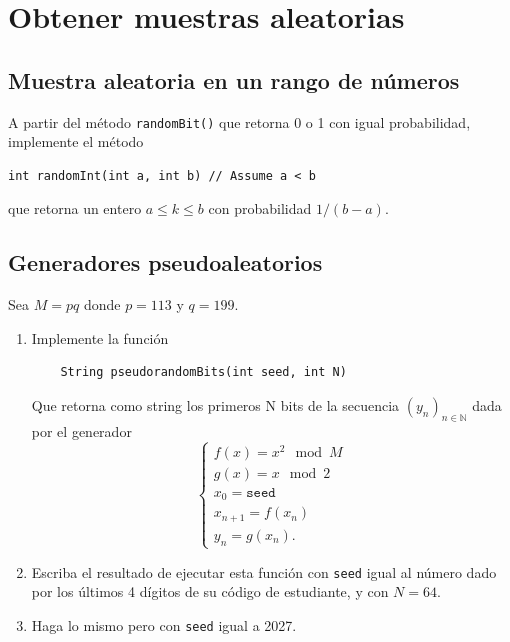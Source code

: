 


\maketitle

\section{Obtener muestras aleatorias}

\subsection{Muestra aleatoria en un rango de números} A partir del método
\texttt{randomBit()} que retorna 0 o 1 con igual probabilidad, implemente el
método

\begin{lstlisting}
int randomInt(int a, int b) // Assume a < b
\end{lstlisting}

que retorna un entero $a \leq k \leq b$ con probabilidad $1/(b-a)$.

\subsection{Generadores pseudoaleatorios} Sea $M= pq$ donde
$p= 113$ y $q= 199$.

\begin{enumerate}
	\item Implemente la función
		
	\begin{lstlisting}
	String pseudorandomBits(int seed, int N)
	\end{lstlisting}
		
	Que retorna como string los primeros N bits de la secuencia
	$(y_n)_{n \in \mathbb{N}}$ dada por el generador
		\[
			\left\{
				\begin{array}{l}
					f(x)= x^2 \mod M\\
					g(x)= x \mod 2\\
					x_0= \mathtt{seed}\\
					x_{n+1}= f(x_n)\\
					y_n= g(x_n).
				\end{array}
			\right.
		\]
	\item Escriba el resultado de ejecutar esta función con \texttt{seed}
		igual al número dado por los últimos 4 dígitos de su código de
		estudiante, y con $N= 64$.
	\item Haga lo mismo pero con \texttt{seed} igual a 2027.
\end{enumerate}

